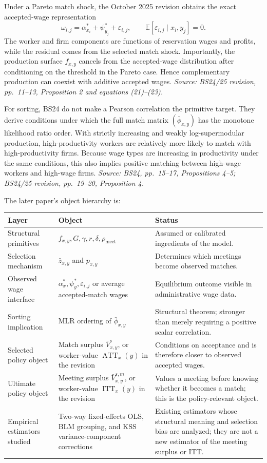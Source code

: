 \documentclass[11pt]{article}
\begin{document}
Under a Pareto match shock, the October 2025 revision obtains the exact
accepted-wage representation
\[
\omega_{i,j}
=
\alpha_{x_i}^*
+\psi_{y_j}^*
+\varepsilon_{i,j},
\qquad
\mathbb E[\varepsilon_{i,j}\mid x_i,y_j]=0.
\tag{T2.10}
\]
The worker and firm components are functions of reservation wages and profits,
while the residual comes from the selected match shock.  Importantly, the
production surface \(f_{x,y}\) cancels from the accepted-wage distribution
after conditioning on the threshold in the Pareto case.  Hence complementary
production can coexist with additive accepted wages.
\textit{Source: BS24/25 revision, pp.\ 11--13, Proposition 2 and
equations (21)--(23).}

For sorting, BS24 do not make a Pearson correlation the primitive target.
They derive conditions under which the full match matrix
\((\bar\phi_{x,y})\) has the monotone likelihood ratio order.  With strictly
increasing and weakly log-supermodular production, high-productivity workers
are relatively more likely to match with high-productivity firms.  Because
wage types are increasing in productivity under the same conditions, this
also implies positive matching between high-wage workers and high-wage firms.
\textit{Source: BS24, pp.\ 15--17, Propositions 4--5; BS24/25 revision,
pp.\ 19--20, Proposition 4.}

The later paper's object hierarchy is:

\begin{longtable}{p{}p{}p{}}
\textbf{Layer} & \textbf{Object} & \textbf{Status} \\
\hline
Structural primitives & \(f_{x,y},G,\gamma,r,\delta,\rho_{\mathrm{meet}}\) &
Assumed or calibrated ingredients of the model. \\
Selection mechanism & \(\bar z_{x,y}\) and \(p_{x,y}\) & Determines which
meetings become observed matches. \\
Observed wage interface & \(\alpha_x^*,\psi_y^*,\varepsilon_{i,j}\) or
average accepted-match wages & Equilibrium outcome visible in administrative
wage data. \\
Sorting implication & MLR ordering of \(\bar\phi_{x,y}\) & Structural theorem;
stronger than merely requiring a positive scalar correlation. \\
Selected policy object & Match surplus \(\bar V^s_{x,y}\), or worker-value
\(\operatorname{ATT}_x(y)\) in the revision & Conditions on acceptance and is
therefore closer to observed accepted wages. \\
Ultimate policy object & Meeting surplus \(\bar V^{s,m}_{x,y}\), or
worker-value \(\operatorname{ITT}_x(y)\) in the revision & Values a meeting
before knowing whether it becomes a match; this is the policy-relevant object. \\
Empirical estimators studied & Two-way fixed-effects OLS, BLM grouping, and
KSS variance-component corrections & Existing estimators whose structural
meaning and selection bias are analyzed; they are not a new estimator of the
meeting surplus or ITT. \\
\end{longtable}
\end{document}
